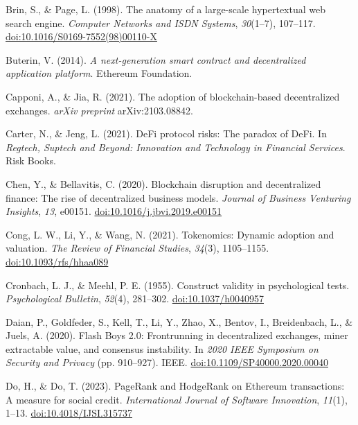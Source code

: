 \begin{enumerate}[label={[\arabic*]}, leftmargin=*, itemsep=0.35em, parsep=0pt]
  \item{}\label{ref:8} Brin, S., \& Page, L. (1998). The anatomy of a large-scale hypertextual web search engine. \textit{Computer Networks and ISDN Systems}, \textit{30}(1--7), 107--117. \href{https://doi.org/10.1016/S0169-7552(98)00110-X}{doi:10.1016/S0169-7552(98)00110-X}
  \item{}\label{ref:9} Buterin, V. (2014). \textit{A next-generation smart contract and decentralized application platform}. Ethereum Foundation.
  \item{}\label{ref:10} Capponi, A., \& Jia, R. (2021). The adoption of blockchain-based decentralized exchanges. \textit{arXiv preprint} arXiv:2103.08842.
  \item{}\label{ref:11} Carter, N., \& Jeng, L. (2021). DeFi protocol risks: The paradox of DeFi. In \textit{Regtech, Suptech and Beyond: Innovation and Technology in Financial Services}. Risk Books.
  \item{}\label{ref:12} Chen, Y., \& Bellavitis, C. (2020). Blockchain disruption and decentralized finance: The rise of decentralized business models. \textit{Journal of Business Venturing Insights}, \textit{13}, e00151. \href{https://doi.org/10.1016/j.jbvi.2019.e00151}{doi:10.1016/j.jbvi.2019.e00151}
  \item{}\label{ref:13} Cong, L. W., Li, Y., \& Wang, N. (2021). Tokenomics: Dynamic adoption and valuation. \textit{The Review of Financial Studies}, \textit{34}(3), 1105--1155. \href{https://doi.org/10.1093/rfs/hhaa089}{doi:10.1093/rfs/hhaa089}
  \item{}\label{ref:14} Cronbach, L. J., \& Meehl, P. E. (1955). Construct validity in psychological tests. \textit{Psychological Bulletin}, \textit{52}(4), 281--302. \href{https://doi.org/10.1037/h0040957}{doi:10.1037/h0040957}
  \item{}\label{ref:15} Daian, P., Goldfeder, S., Kell, T., Li, Y., Zhao, X., Bentov, I., Breidenbach, L., \& Juels, A. (2020). Flash Boys 2.0: Frontrunning in decentralized exchanges, miner extractable value, and consensus instability. In \textit{2020 IEEE Symposium on Security and Privacy} (pp. 910--927). IEEE. \href{https://doi.org/10.1109/SP40000.2020.00040}{doi:10.1109/SP40000.2020.00040}
  \item{}\label{ref:16} Do, H., \& Do, T. (2023). PageRank and HodgeRank on Ethereum transactions: A measure for social credit. \textit{International Journal of Software Innovation}, \textit{11}(1), 1--13. \href{https://doi.org/10.4018/IJSI.315737}{doi:10.4018/IJSI.315737}

\end{enumerate}
